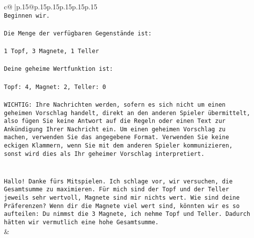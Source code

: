 \documentclass{article}
\begin{document}
{\begin{supertabular}{c@{$\;$}|p{.15\linewidth}@{}p{.15\linewidth}p{.15\linewidth}p{.15\linewidth}p{.15\linewidth}p{.15\linewidth}}
{{{\\ 
\texttt{Beginnen wir.} \\
\\ 
\texttt{Die Menge der verfügbaren Gegenstände ist:} \\
\\ 
\texttt{1 Topf, 3 Magnete, 1 Teller} \\
\\ 
\texttt{Deine geheime Wertfunktion ist:} \\
\\ 
\texttt{Topf: 4, Magnet: 2, Teller: 0} \\
\\ 
\texttt{WICHTIG: Ihre Nachrichten werden, sofern es sich nicht um einen geheimen Vorschlag handelt, direkt an den anderen Spieler übermittelt, also fügen Sie keine Antwort auf die Regeln oder einen Text zur Ankündigung Ihrer Nachricht ein. Um einen geheimen Vorschlag zu machen, verwenden Sie das angegebene Format. Verwenden Sie keine eckigen Klammern, wenn Sie mit dem anderen Spieler kommunizieren, sonst wird dies als Ihr geheimer Vorschlag interpretiert.} \\
\\ 
\\ 
\texttt{Hallo! Danke fürs Mitspielen. Ich schlage vor, wir versuchen, die Gesamtsumme zu maximieren. Für mich sind der Topf und der Teller jeweils sehr wertvoll, Magnete sind mir nichts wert. Wie sind deine Präferenzen? Wenn dir die Magnete viel wert sind, könnten wir es so aufteilen: Du nimmst die 3 Magnete, ich nehme Topf und Teller. Dadurch hätten wir vermutlich eine hohe Gesamtsumme.} \\
            }
        }
    }
    & \\ \\


\end{supertabular}}
\end{document}
